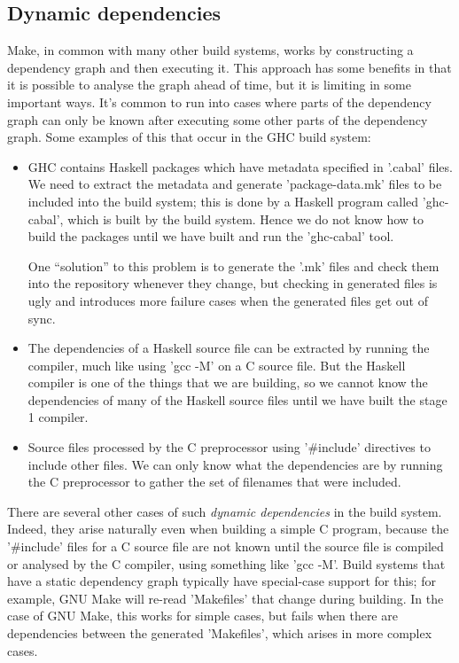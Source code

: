 \subsection{Dynamic dependencies\label{sec:dynamic-deps}}

Make, in common with many other build systems, works by
constructing a dependency graph and then executing it. This approach
has some benefits in that it is possible to analyse the graph ahead of
time, but it is limiting in some important ways.  It's common to run
into cases where parts of the dependency graph can only be known after
executing some other parts of the dependency graph.  Some examples of
this that occur in the GHC build system:

\begin{itemize}
\item GHC contains Haskell packages which have metadata specified in
  \lst'.cabal' files. We need to extract the metadata and generate
  \lst'package-data.mk' files to be included into the build system; this
  is done by a Haskell program called \lst'ghc-cabal', which is built by the
  build system. Hence we do not know how to build the packages until we have
  built and run the \lst'ghc-cabal' tool.

  One ``solution'' to this problem is to generate the \lst'.mk'
  files and check them into the repository whenever they change, but
  checking in generated files is ugly and introduces more failure
  cases when the generated files get out of sync.

\item The dependencies of a Haskell source file can be extracted by
  running the compiler, much like using \lst'gcc -M' on a C source
  file.  But the Haskell compiler is one of the things that we are
  building, so we cannot know the dependencies of many of the Haskell
  source files until we have built the stage 1 compiler.

\item Source files processed by the C preprocessor using
  \lst'#include' directives to include other files.  We can only
  know what the dependencies are by running the C preprocessor to
  gather the set of filenames that were included.
\end{itemize}

There are several other cases of such \emph{dynamic dependencies} in the build
system. Indeed, they arise naturally even when building a simple C program,
because the \lst'#include' files for a C source file are not known until the
source file is compiled or analysed by the C compiler, using something like
\lst'gcc -M'. Build systems that have a static dependency graph typically have
special-case support for this; for example, GNU Make will re-read
\lst'Makefiles' that change during building.  In the case of GNU Make,
this works for simple cases, but fails when there are dependencies
between the generated \lst'Makefiles', which arises in more complex cases.


